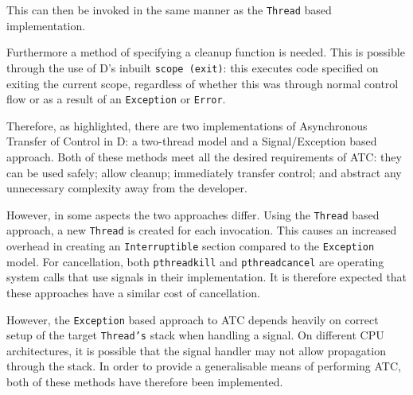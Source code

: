 This can then be invoked in the same manner as the \texttt{Thread} based
implementation.
\par\bigskip\noindent
Furthermore a method of specifying a cleanup function is needed. This
is possible through the use of D's inbuilt \texttt{scope (exit)}:
this executes code specified on exiting the current scope, regardless of
whether this was through normal control flow or as a result of an
\texttt{Exception} or \texttt{Error}. 
\par\bigskip\noindent
Therefore, as highlighted, there are two implementations of Asynchronous
Transfer of Control in D: a two-thread model and a Signal/Exception based
approach. Both of these methods meet all the desired requirements of ATC: 
they can be used safely; allow cleanup; immediately transfer control; and
abstract any unnecessary complexity away from the developer. 
\par\bigskip\noindent
However, in some aspects the two approaches differ. 
Using the \texttt{Thread} based approach, a new \texttt{Thread} is
created for each invocation. This causes an increased overhead in creating an 
\texttt{Interruptible} section compared to the \texttt{Exception} model.
For cancellation, both
\texttt{pthread\textunderscore{}kill} and \texttt{pthread\textunderscore{}cancel}
are operating system calls that use signals in their implementation. It is
therefore expected that these approaches have a similar cost of cancellation.
\par\bigskip\noindent
However, the \texttt{Exception} based approach to ATC depends heavily on correct 
setup of the target \texttt{Thread's} stack when handling a signal. 
On different CPU architectures, it is possible that the signal handler may not 
allow propagation through the stack.
In order to provide a generalisable means of performing ATC, both of
these methods have therefore been implemented. 

